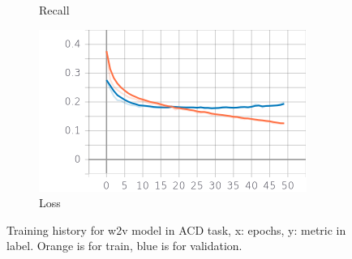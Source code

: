 \documentclass{article}
\begin{document}
\begin{figure}
\begin{subfigure}{.33\textwidth}
 		            \caption{Recall}
 		            \label{w2v_acd_epoch_recall}
		        \end{subfigure}
                \begin{subfigure}{.33\textwidth}
 		            \centering
 		            \includegraphics[width=\textwidth]{imgs/plots/w2v_acd_epoch_loss.png}
 		            \caption{Loss}
 		            \label{w2v_acd_epoch_loss}
		        \end{subfigure}
		    \caption{Training history for w2v model in ACD task, x: epochs, y: metric in label.
                    \color{orange} Orange is for train, \color{blue} blue is for validation.\color{black}}
		    \label{w2v_acd_history}
	        \end{figure}
\end{document}
